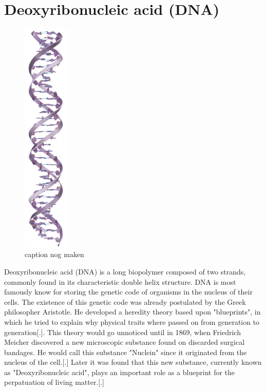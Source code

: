 \section{Deoxyribonucleic acid (DNA)}

\begin{figure}
  \begin{center}
    \includegraphics[width=0.2\textwidth]{Figures/DNAStrand.png}
  \end{center}
  \caption{caption nog maken}
\end{figure}

Deoxyribonucleic acid (DNA) is a long biopolymer composed of two strands, commonly found
in its characteristic double helix structure. DNA is most famously know for storing the
genetic code of organisms in the nucleus of their cells. The existence of this genetic
code was already
postulated by the Greek philosopher Aristotle. He developed a heredity theory based
upon "blueprints", in which he tried to explain why physical traits where passed on from
generation to generation[.]. This theory would go unnoticed until in 1869, when
Friedrich Meicher discovered a new microscopic substance found on discarded
surgical bandages. He would call this substance "Nuclein" since it originated
from the nucleus of the cell.[.] Later it was found that this new substance, currently
known as "Deoxyribonucleic acid", plays an important role as a blueprint for the
perpatuation of living matter.[.]

